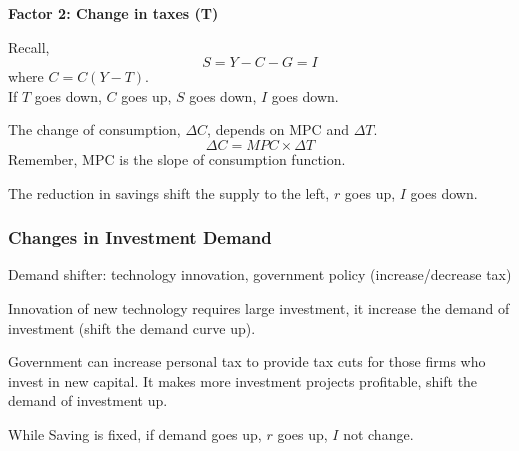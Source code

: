 \documentclass[12pt]{article}
\begin{document}
{\textbf {Factor 2: Change in taxes (T)}}

Recall,
\begin{equation*}
S = Y - C - G = I
\end{equation*}
where $ C = C(Y - T) $.\\
If $ T $ goes down, $ C $ goes up, $ S $ goes down, $ I $ goes down.

The change of consumption, $ \Delta C $, depends on MPC and $ \Delta T $.
\begin{equation*}
\Delta C = MPC  \times \Delta T
\end{equation*}
Remember, MPC is the slope of consumption function.

The reduction in savings shift the supply to the left, $ r $ goes up, $ I $ goes down.



\subsubsection{Changes in Investment Demand}


Demand shifter: technology innovation, government policy (increase/decrease tax)

Innovation of new technology requires large investment, it increase the demand of 
investment (shift the demand curve up).

Government can increase personal tax to provide tax cuts for those firms who invest
in new capital. It makes more investment projects profitable, shift the demand of 
investment up.

While Saving is fixed, if demand goes up, $ r $ goes up, $ I $ not change.
\begin{figure}[H]
\end{figure}
\end{document}

